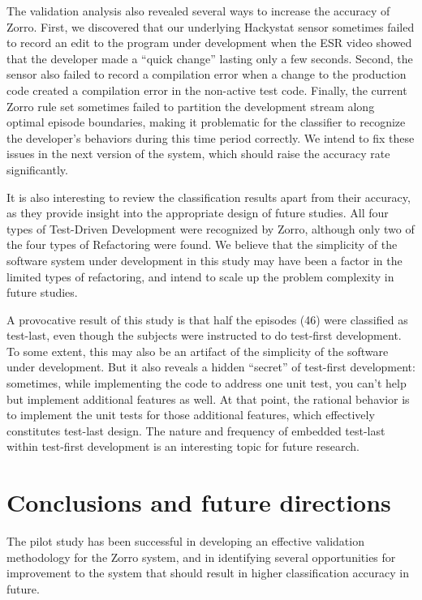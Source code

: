 \documentclass[runningheads]{llncs}
\begin{document}
The validation analysis also revealed several ways to increase the accuracy
of Zorro.  First, we discovered that our underlying Hackystat sensor
sometimes failed to record an edit to the program under development when
the ESR video showed that the developer made a ``quick change'' lasting
only a few seconds. Second, the sensor also failed to record a compilation
error when a change to the production code created a compilation error in
the non-active test code.  Finally, the current Zorro rule set sometimes
failed to partition the development stream along optimal episode
boundaries, making it problematic for the classifier to recognize the
developer's behaviors during this time period correctly. We intend to fix
these issues in the next version of the system, which should raise the
accuracy rate significantly.

It is also interesting to review the classification results apart from
their accuracy, as they provide insight into the appropriate design of
future studies. All four types of Test-Driven Development were recognized
by Zorro, although only two of the four types of Refactoring were found.
We believe that the simplicity of the software system under development in
this study may have been a factor in the limited types of refactoring, and
intend to scale up the problem complexity in future studies.

A provocative result of this study is that half the episodes (46) were
classified as test-last, even though the subjects were instructed to do
test-first development.  To some extent, this may also be an artifact of
the simplicity of the software under development. But it also reveals a
hidden ``secret'' of test-first development: sometimes, while implementing
the code to address one unit test, you can't help but implement additional
features as well. At that point, the rational behavior is to implement the
unit tests for those additional features, which effectively constitutes
test-last design.  The nature and frequency of embedded test-last within
test-first development is an interesting topic for future research.

\section{Conclusions and future directions}
\label{sec:conclusions}

The pilot study has been successful in developing an effective validation
methodology for the Zorro system, and in identifying several opportunities
for improvement to the system that should result in higher classification
accuracy in future. 
\end{document}
